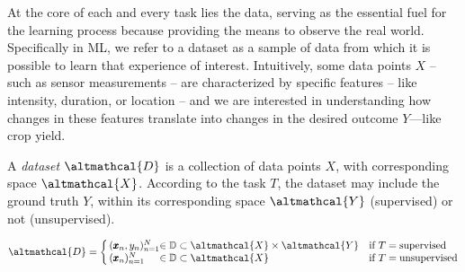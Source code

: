 \documentclass[a4paper,12pt,times,numbered,print,index]{Classes/PhDThesisPSnPDF}
\begin{document}
At the core of each and every task lies the data, serving as the essential fuel for the learning process because providing the means to observe the real world.
Specifically in ML, we refer to a dataset as a sample of data from which it is possible to learn that experience of interest.
Intuitively, some data points $X$ -- such as sensor measurements -- are characterized by specific features -- like intensity, duration, or location -- and we are interested in understanding how changes in these features translate into changes in the desired outcome $Y$---like crop yield.

\begin{definition}[Dataset]\label{def:dataset}
    A \textit{dataset} $\altmathcal{D}$ is a collection of data points $X$, with corresponding space $\altmathcal{X}$.
    According to the task $T$, the dataset may include the ground truth $Y$, within its corresponding space $\altmathcal{Y}$ (supervised) or not (unsupervised).

    \begin{equation}\label{eq:dataset}
        \altmathcal{D} = \left\lbrace\,
        \begin{array}{@{}l@{}l@{\quad}l@{}}
            (\pmb{x}_n, y_n)_{n=1}^N & \in \mathbb{D} \subset \altmathcal{X} \times \altmathcal{Y} & \text{{if }} T = \text{{supervised}} \\
            (\pmb{x}_n)_{n=1}^N & \in \mathbb{D} \subset \altmathcal{X} & \text{{if }} T = \text{{unsupervised}}
        \end{array}
        \right.
    \end{equation}
\end{definition}
\end{document}
